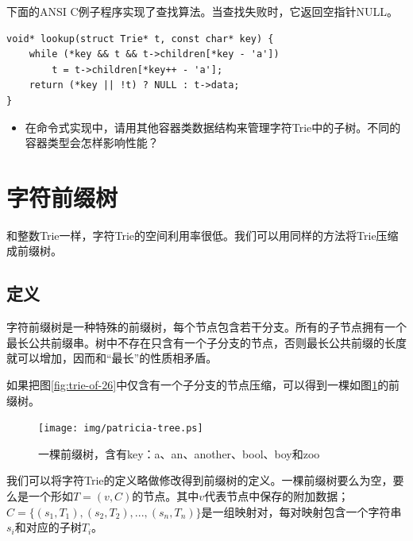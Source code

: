 \documentclass[b5paper]{ctexart}
\begin{document}
下面的ANSI C例子程序实现了查找算法。当查找失败时，它返回空指针NULL。

\lstset{language=C}
\begin{lstlisting}
void* lookup(struct Trie* t, const char* key) {
    while (*key && t && t->children[*key - 'a'])
        t = t->children[*key++ - 'a'];
    return (*key || !t) ? NULL : t->data;
}
\end{lstlisting}


\begin{Exercise}
\begin{itemize}
\item 在命令式实现中，请用其他容器类数据结构来管理字符Trie中的子树。不同的容器类型会怎样影响性能？
\end{itemize}
\end{Exercise}

\section{字符前缀树}

和整数Trie一样，字符Trie的空间利用率很低。我们可以用同样的方法将Trie压缩成前缀树。

\subsection{定义}

字符前缀树是一种特殊的前缀树，每个节点包含若干分支。所有的子节点拥有一个最长公共前缀串。树中不存在只含有一个子分支的节点，否则最长公共前缀的长度就可以增加，因而和“最长”的性质相矛盾。

如果把图\ref{fig:trie-of-26}中仅含有一个子分支的节点压缩，可以得到一棵如图\ref{fig:patricia-tree}的前缀树。

\begin{figure}[htbp]
  \centering
  \texttt{[image: img/patricia-tree.ps]}
  \caption{一棵前缀树，含有key：a、an、another、bool、boy和zoo}
  \label{fig:patricia-tree}
\end{figure}

我们可以将字符Trie的定义略做修改得到前缀树的定义。一棵前缀树要么为空，要么是一个形如$T = (v, C)$的节点。其中$v$代表节点中保存的附加数据；$C = \{(s_1, T_1), (s_2, T_2), ..., (s_n, T_n)\}$是一组映射对，每对映射包含一个字符串$s_i$和对应的子树$T_i$。
\end{document}
